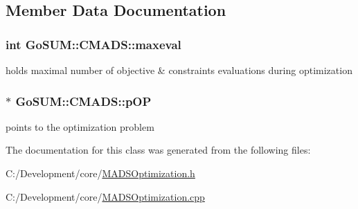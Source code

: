 \subsection{Member Data Documentation}
\hypertarget{class_go_s_u_m_1_1_c_m_a_d_s_a32b63abd38e4866c6d75ebb7d0f51195}{
\subsubsection[{maxeval}]{\setlength{\rightskip}{0pt plus 5cm}int Go\-S\-U\-M\-::\-C\-M\-A\-D\-S\-::maxeval\hspace{0.3cm}{\ttfamily [protected]}}}\label{class_go_s_u_m_1_1_c_m_a_d_s_a32b63abd38e4866c6d75ebb7d0f51195}
holds maximal number of objective \& constraints evaluations during optimization \hypertarget{class_go_s_u_m_1_1_c_m_a_d_s_a181584f16f368a69f6bd2d71e2f88f3c}{
\subsubsection[{p\-O\-P}]{$\ast$ Go\-S\-U\-M\-::\-C\-M\-A\-D\-S\-::p\-O\-P\hspace{0.3cm}{\ttfamily [protected]}}}\label{class_go_s_u_m_1_1_c_m_a_d_s_a181584f16f368a69f6bd2d71e2f88f3c}


points to the optimization problem 



The documentation for this class was generated from the following files\-:\begin{DoxyCompactItemize}
\item 
C\-:/\-Development/core/\hyperlink{_m_a_d_s_optimization_8h}{M\-A\-D\-S\-Optimization.\-h}\item 
C\-:/\-Development/core/\hyperlink{_m_a_d_s_optimization_8cpp}{M\-A\-D\-S\-Optimization.\-cpp}\end{DoxyCompactItemize}

